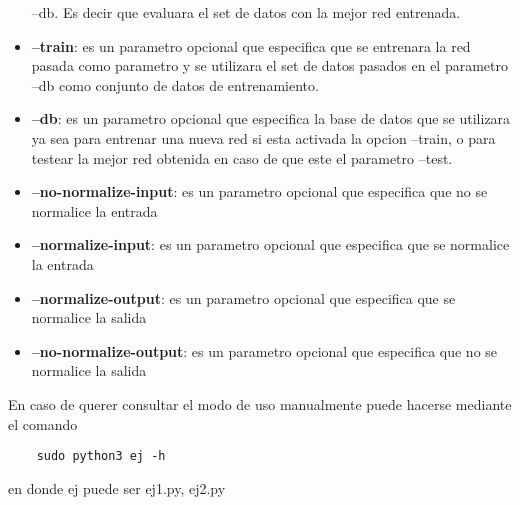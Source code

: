 \begin{itemize}
                        --db. Es decir que evaluara el set de datos con la mejor red entrenada.
  \item \textbf{--train}: es un parametro opcional que especifica que se entrenara la red pasada como parametro y se utilizara el set de datos pasados en el parametro --db
                        como conjunto de datos de entrenamiento.
  \item \textbf{--db}: es un parametro opcional que especifica la base de datos que se utilizara ya sea para entrenar una nueva red si esta activada la opcion --train, o
                        para testear la mejor red obtenida en caso de que este el parametro --test.
  \item \textbf{--no-normalize-input}: es un parametro opcional que especifica que no se normalice la entrada
  \item \textbf{--normalize-input}: es un parametro opcional que especifica que se normalice la entrada
  \item \textbf{--normalize-output}: es un parametro opcional que especifica que se normalice la salida
  \item \textbf{--no-normalize-output}: es un parametro opcional que especifica que no se normalice la salida
\end{itemize}

En caso de querer consultar el modo de uso manualmente puede hacerse mediante el comando
\begin{verbatim}
    sudo python3 ej -h
\end{verbatim}
en donde ej puede ser {ej1.py, ej2.py}
%

\newpage
